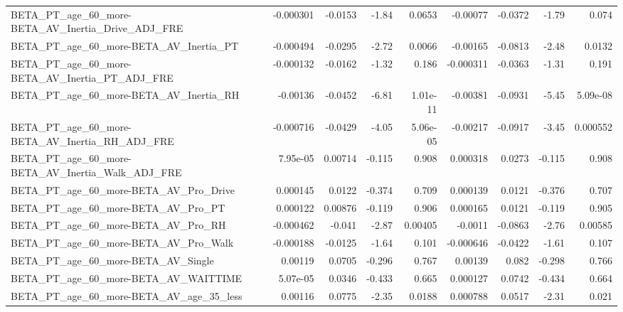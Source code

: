 \begin{tabular}{lrrrrrrrr}
BETA\_PT\_age\_60\_more-BETA\_AV\_Inertia\_Drive\_ADJ\_FRE  &   -0.000301 &      -0.0153 &    -1.84 &   0.0653 &   -0.00077 &     -0.0372 &        -1.79 &         0.074 \\
BETA\_PT\_age\_60\_more-BETA\_AV\_Inertia\_PT             &   -0.000494 &      -0.0295 &    -2.72 &   0.0066 &   -0.00165 &     -0.0813 &        -2.48 &        0.0132 \\
BETA\_PT\_age\_60\_more-BETA\_AV\_Inertia\_PT\_ADJ\_FRE     &   -0.000132 &      -0.0162 &    -1.32 &    0.186 &  -0.000311 &     -0.0363 &        -1.31 &         0.191 \\
BETA\_PT\_age\_60\_more-BETA\_AV\_Inertia\_RH             &    -0.00136 &      -0.0452 &    -6.81 & 1.01e-11 &   -0.00381 &     -0.0931 &        -5.45 &      5.09e-08 \\
BETA\_PT\_age\_60\_more-BETA\_AV\_Inertia\_RH\_ADJ\_FRE     &   -0.000716 &      -0.0429 &    -4.05 & 5.06e-05 &   -0.00217 &     -0.0917 &        -3.45 &      0.000552 \\
BETA\_PT\_age\_60\_more-BETA\_AV\_Inertia\_Walk\_ADJ\_FRE   &    7.95e-05 &      0.00714 &   -0.115 &    0.908 &   0.000318 &      0.0273 &       -0.115 &         0.908 \\
BETA\_PT\_age\_60\_more-BETA\_AV\_Pro\_Drive              &    0.000145 &       0.0122 &   -0.374 &    0.709 &   0.000139 &      0.0121 &       -0.376 &         0.707 \\
BETA\_PT\_age\_60\_more-BETA\_AV\_Pro\_PT                 &    0.000122 &      0.00876 &   -0.119 &    0.906 &   0.000165 &      0.0121 &       -0.119 &         0.905 \\
BETA\_PT\_age\_60\_more-BETA\_AV\_Pro\_RH                 &   -0.000462 &       -0.041 &    -2.87 &  0.00405 &    -0.0011 &     -0.0863 &        -2.76 &       0.00585 \\
BETA\_PT\_age\_60\_more-BETA\_AV\_Pro\_Walk               &   -0.000188 &      -0.0125 &    -1.64 &    0.101 &  -0.000646 &     -0.0422 &        -1.61 &         0.107 \\
BETA\_PT\_age\_60\_more-BETA\_AV\_Single                 &     0.00119 &       0.0705 &   -0.296 &    0.767 &    0.00139 &       0.082 &       -0.298 &         0.766 \\
BETA\_PT\_age\_60\_more-BETA\_AV\_WAITTIME               &    5.07e-05 &       0.0346 &   -0.433 &    0.665 &   0.000127 &      0.0742 &       -0.434 &         0.664 \\
BETA\_PT\_age\_60\_more-BETA\_AV\_age\_35\_less            &     0.00116 &       0.0775 &    -2.35 &   0.0188 &   0.000788 &      0.0517 &        -2.31 &         0.021 \\

\end{tabular}
